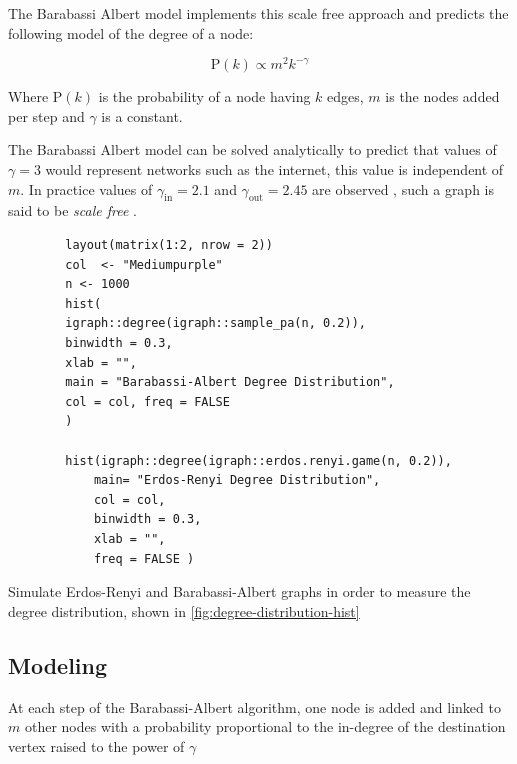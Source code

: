 \documentclass[11pt, twoside]{report}
\begin{document}
The Barabassi Albert model implements this scale free approach and predicts the following model of the degree of a node:

\[
\mathrm{P}\left(k\right) \propto m^2 k^{-\gamma}
\]


Where \(\mathrm{P}\left(k\right)\) is the probability of a node having \(k\) edges, \(m\) is the nodes added per step and \(\gamma\) is a constant.

The Barabassi Albert model can be solved analytically to predict that values of \(\gamma=3\) would
represent networks such as the internet, this value is independent of \(m\).
In practice values of \(\gamma_{\mathrm{in}}= 2.1\) and
\(\gamma_{\mathrm{out}} = 2.45\) are observed
\cite[]{barabasiScalefreeCharacteristicsRandom2000}, such a graph is said to be
\textit{scale free} \cite[.2]{langvilleGooglePageRankScience2012}.



\begin{listing}[htbp]
    \begin{tcolorbox}
        \begin{verbatim}
        layout(matrix(1:2, nrow = 2))
        col  <- "Mediumpurple"
        n <- 1000
        hist(
        igraph::degree(igraph::sample_pa(n, 0.2)),
        binwidth = 0.3,
        xlab = "",
        main = "Barabassi-Albert Degree Distribution",
        col = col, freq = FALSE
        )

        hist(igraph::degree(igraph::erdos.renyi.game(n, 0.2)),
            main= "Erdos-Renyi Degree Distribution",
            col = col,
            binwidth = 0.3,
            xlab = "",
            freq = FALSE )
        \end{verbatim}
    \end{tcolorbox}
\caption{\label{degree-distribution-hist}Simulate Erdos-Renyi and Barabassi-Albert graphs in order to measure the degree distribution,  shown in \ref{fig:degree-distribution-hist}}
\end{listing}



\subsection{Modeling}
\label{sec:orgb52cc3e}
At each step of the Barabassi-Albert algorithm, one node is added and linked to \(m\) other nodes with a probability proportional to the in-degree of the destination vertex raised to the power of \(\gamma\)
\end{document}
